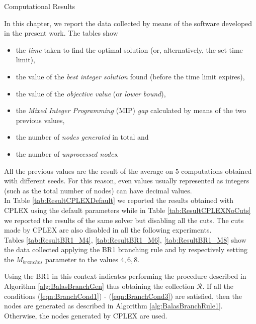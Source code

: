 \documentclass[a4paper,12pt]{mydeitesi_eng}
\begin{document}
\begin{chapter}{Computational Results}
\label{chp:ComputationalResults}

In this chapter, we report the data collected by means of the software developed in the present work.
The tables show
\begin{itemize}
\item the \emph{time} taken to find the optimal solution (or, alternatively, the set time limit),
\item the value of the \emph{best integer solution} found (before the time limit expires),
\item the value of the \emph{objective value} (or \emph{lower bound}),
\item the \emph{Mixed Integer Programming} (MIP) \emph{gap} calculated by means of the two previous values,
\item the number of \emph{nodes generated} in total and
\item the number of \emph{unprocessed nodes}.
\end{itemize}
All the previous values are the result of the average on $5$ computations obtained with different seeds.
For this reason, even values usually represented as integers (such as the total number of nodes) can have decimal values.\\

In Table \ref{tab:ResultCPLEXDefault} we reported the results obtained with CPLEX using the default parameters while in Table \ref{tab:ResultCPLEXNoCuts} we reported the results of the same solver but disabling all the cuts.
The cuts made by CPLEX are also disabled in all the following experiments.
\\

Tables \ref{tab:ResultBR1_M4}, \ref{tab:ResultBR1_M6}, \ref{tab:ResultBR1_M8} show the data collected applying the BR1 branching rule and by respectively setting the $M_{branches}$ parameter to the values $4,6,8$.

Using the BR1 in this context indicates performing the procedure described in Algorithm \ref{alg:BalasBranchGen} thus obtaining the collection $\mathcal{R}$.
If all the conditions (\ref{eqn:BranchCond1}) - (\ref{eqn:BranchCond3}) are satisfied, then the nodes are generated as described in Algorithm \ref{alg:BalasBranchRule1}.
Otherwise, the nodes generated by CPLEX are used.


\end{chapter}
\end{document}
